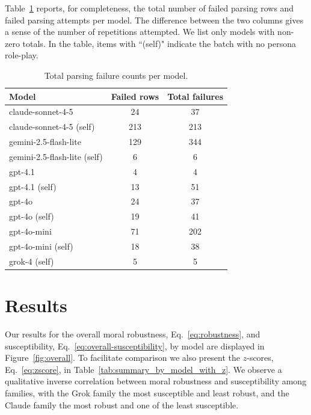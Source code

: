 \documentclass{article}
\begin{document}
Table~\ref{tab:failures_by_model} reports, for completeness, the total number of failed parsing rows and failed parsing attempts per model. The difference between the two columns gives a sense of the number of repetitions attempted. We list only models with non-zero totals. In the table, items with ``(self)" indicate the batch with no persona role-play.

\begin{table}[t]
  \centering
  \caption{Total parsing failure counts per model.}
  \label{tab:failures_by_model}
  \begin{tabular}{lcc}
    \toprule
    Model & Failed rows & Total failures \\
    \midrule
    claude-sonnet-4-5 & 24 & 37  \\
    claude-sonnet-4-5 (self) & 213	& 213  \\
    gemini-2.5-flash-lite & 129 & 344 \\
    gemini-2.5-flash-lite (self) & 6 & 6 \\
    gpt-4.1 & 4 & 4   \\
    gpt-4.1 (self) & 13 & 51   \\
    gpt-4o & 24 & 37  \\
    gpt-4o (self) & 19 & 41  \\
    gpt-4o-mini & 71 & 202 \\
    gpt-4o-mini (self) & 18 & 38 \\
    grok-4 (self) & 5 & 5 \\
    \bottomrule
  \end{tabular}
\end{table}




\section{Results}

Our results for the overall moral robustness, Eq.~\eqref{eq:robustness}, and susceptibility, Eq.~\eqref{eq:overall-susceptibility}, by model are displayed in Figure~\ref{fig:overall}. To facilitate comparison we also present the $z$-scores, Eq.~\eqref{eq:zscore}, in Table~\ref{tab:summary_by_model_with_z}.  We observe a qualitative inverse correlation between moral robustness and susceptibility among families, with the Grok family the most susceptible and least robust, and the Claude family the most robust and one of the least susceptible.
\end{document}
